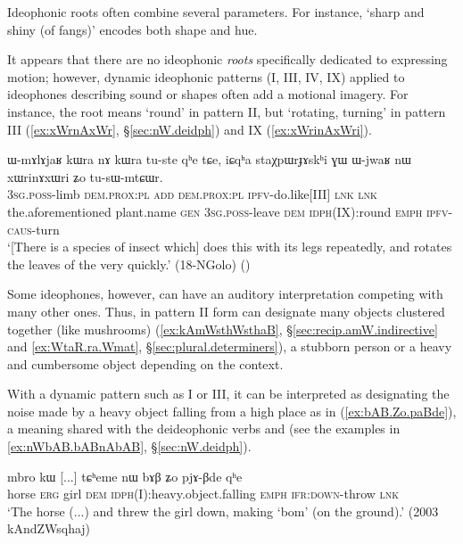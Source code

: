 Ideophonic roots often combine several parameters. For instance,  `sharp and shiny (of fangs)' encodes both shape and hue.


It appears that there are no ideophonic \textit{roots} specifically dedicated to expressing motion; however, dynamic ideophonic patterns (I, III, IV, IX) applied to ideophones describing sound or shapes often add a motional imagery. For instance, the root  means `round' in pattern II, but `rotating, turning' in pattern III (\ref{ex:xWrnAxWr}, §\ref{sec:nW.deidph}) and IX (\ref{ex:xWrinAxWri}).

\begin{exe} 
\ex  \label{ex:xWrinAxWri}
\gll ɯ-mɤlɤjaʁ kɯra nɤ kɯra tu-ste qʰe tɕe, iɕqʰa staχpɯrɟɤskʰi ɣɯ ɯ-jwaʁ nɯ xɯrinɤxɯri ʑo tu-sɯ-mtɕɯr. \\
\textsc{3sg}.\textsc{poss}-limb \textsc{dem}.\textsc{prox}:\textsc{pl} \textsc{add}  \textsc{dem}.\textsc{prox}:\textsc{pl} \textsc{ipfv}-do.like[III] \textsc{lnk} \textsc{lnk} the.aforementioned plant.name \textsc{gen} \textsc{3sg}.\textsc{poss}-leave \textsc{dem} \textsc{idph}(IX):round \textsc{emph} \textsc{ipfv}-\textsc{caus}-turn \\
\glt `[There is a species of insect which] does this with its legs repeatedly, and rotates the leaves of the  very quickly.' (18-NGolo)
()
\end{exe} 

Some ideophones, however, can have an auditory interpretation competing with many other ones. Thus,  in pattern II form  can designate many objects clustered together (like mushrooms) (\ref{ex:kAmWsthWsthaB}, §\ref{sec:recip.amW.indirective} and \ref{ex:WtaR.ra.Wmat}, §\ref{sec:plural.determiners}), a stubborn person or a heavy and cumbersome object depending on the context. 

With a dynamic pattern such as I or III, it can be interpreted as designating the noise made by a heavy object falling from a high place as in (\ref{ex:bAB.Zo.paBde}), a meaning shared with the deideophonic verbs  and  (see the examples in  \ref{ex:nWbAB.bABnAbAB}, §\ref{sec:nW.deidph}).

\begin{exe}
\ex \label{ex:bAB.Zo.paBde}
\gll mbro kɯ [...] tɕʰeme nɯ bɤβ ʑo pjɤ-βde qʰe \\
horse \textsc{erg} { } girl \textsc{dem} \textsc{idph}(I):heavy.object.falling \textsc{emph} \textsc{ifr}:\textsc{down}-throw \textsc{lnk}  \\
\glt `The horse (...) and threw the girl down, making `bom' (on the ground).' (2003 kAndZWsqhaj)
\end{exe}


